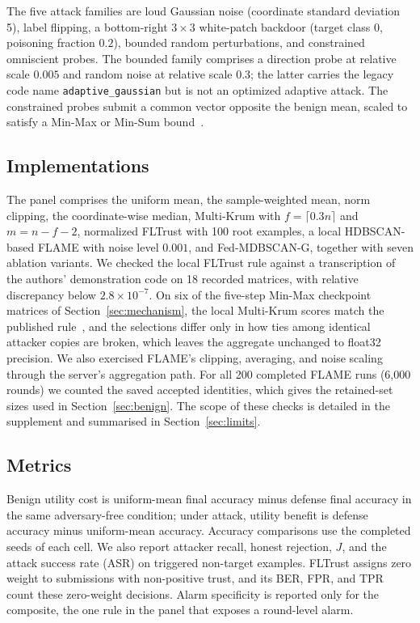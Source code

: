 \documentclass[journal]{IEEEtran}
\newcommand{\method}{Fed-MDBSCAN-G}
\begin{document}
The five attack families are loud Gaussian noise (coordinate standard deviation 5), label flipping, a bottom-right $3\times3$ white-patch backdoor (target class 0, poisoning fraction $0.2$), bounded random perturbations, and constrained omniscient probes. The bounded family comprises a direction probe at relative scale $0.005$ and random noise at relative scale $0.3$; the latter carries the legacy code name \texttt{adaptive\_gaussian} but is not an optimized adaptive attack. The constrained probes submit a common vector opposite the benign mean, scaled to satisfy a Min-Max or Min-Sum bound~\cite{shejwalkar2021}.

\subsection{Implementations}\label{sec:fidelity}
The panel comprises the uniform mean, the sample-weighted mean, norm clipping, the coordinate-wise median, Multi-Krum with $f=\lceil0.3n\rceil$ and $m=n-f-2$, normalized FLTrust with 100 root examples, a local HDBSCAN-based FLAME with noise level $0.001$, and \method{}, together with seven ablation variants. We checked the local FLTrust rule against a transcription of the authors' demonstration code on 18 recorded matrices, with relative discrepancy below $2.8\times10^{-7}$. On six of the five-step Min-Max checkpoint matrices of Section~\ref{sec:mechanism}, the local Multi-Krum scores match the published rule~\cite{blanchard2017}, and the selections differ only in how ties among identical attacker copies are broken, which leaves the aggregate unchanged to float32 precision. We also exercised FLAME's clipping, averaging, and noise scaling through the server's aggregation path. For all 200 completed FLAME runs (6{,}000 rounds) we counted the saved accepted identities, which gives the retained-set sizes used in Section~\ref{sec:benign}. The scope of these checks is detailed in the supplement and summarised in Section~\ref{sec:limits}.

\subsection{Metrics}
Benign utility cost is uniform-mean final accuracy minus defense final accuracy in the same adversary-free condition; under attack, utility benefit is defense accuracy minus uniform-mean accuracy. Accuracy comparisons use the completed seeds of each cell. We also report attacker recall, honest rejection, $J$, and the attack success rate (ASR) on triggered non-target examples. FLTrust assigns zero weight to submissions with non-positive trust, and its BER, FPR, and TPR count these zero-weight decisions. Alarm specificity is reported only for the composite, the one rule in the panel that exposes a round-level alarm.
\end{document}
